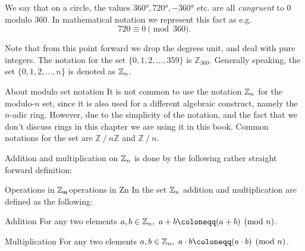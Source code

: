 We say that on a circle, the values $\ang{360}, \ang{720}, -\ang{360}$ etc. are all \emph{cungruent} to $0$ modulo $360$. In mathematical notation we represent this fact as e.g.
\begin{equation}
	720 \equiv 0 \pmod{360}.
	\label{eq:mod 360}
\end{equation}

Note that from this point forward we drop the degrees unit, and deal with pure integers.
The notation for the set $\{0,1,2,\dots,359\}$ is $\mathbb{Z}_{360}$. Generally speaking, the set $\{0,1,2,\dots,n\}$ is denoted as $\mathbb{Z}_{n}$.

\begin{note}{About modulo set notation}{}
	It is not common to use the notation $\mathbb{Z}_{n}$ for the modulo-$n$ set, since it is also used for a different algebraic construct, namely the $n$-adic ring. However, due to the simplicity of the notation, and the fact that we don't discuss rings in this chapter we are using it in this book. Common notations for the set are $\mathbb{Z}\mathbin{/} n\mathbb{Z}$ and $\mathbb{Z}\mathbin{/} n$.
\end{note}

Addition and multiplication on $\mathbb{Z}_{n}$ is done by the following rather straight forward definition:
\begin{definition}{Operations in $\bm{\mathbb{Z}_{n}}$}{operations in Zn}
	In the set $\mathbb{Z}_{n}$ addition and multiplication are defined as the following:
	\begin{descitemize}
	\item[Addition] For any two elements $a,b\in\Z{n},\ a+b\coloneqq(a+b)\pmod{n}$.
	\item[Multiplication] For any two elements $a,b\in\Z{n},\ a\cdot b\coloneqq(a\cdot b)\pmod{n}$.
	\end{descitemize}
\end{definition}

